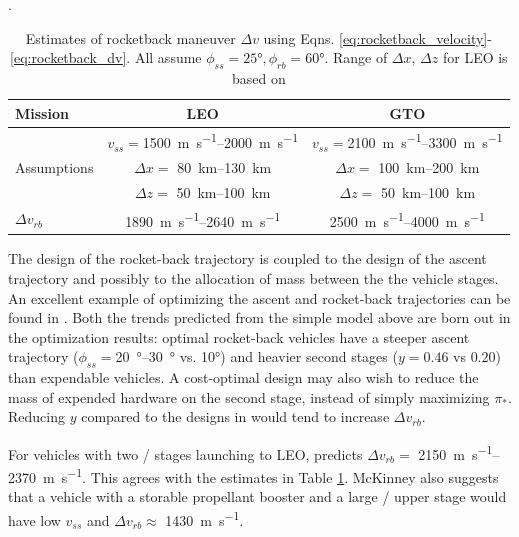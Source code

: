 \documentclass[conf]{new-aiaa}
\begin{document}
\begin{table}
	\caption{\label{tab:rocketback} Estimates of rocketback maneuver $\Delta v$ using Eqns. \ref{eq:rocketback_velocity}-\ref{eq:rocketback_dv}. All assume $\phi_{ss}=\ang{25}, \phi_{rb}=\ang{60}$. Range of $\Delta x$, $\Delta z$ for LEO is based on \cite{McKinney1986}}.
	\centering
	\begin{tabular}{l c c}
		Mission & LEO & GTO \\
		\hline
		& $v_{ss} = $\SIrange{1500}{2000}{\meter\per\second} & $v_{ss} = $\SIrange{2100}{3300}{\meter\per\second} \\
		Assumptions & $\Delta x = $ \SIrange{80}{130}{\kilo\meter} & $\Delta x = $ \SIrange{100}{200}{\kilo\meter} \\
		& $\Delta z = $ \SIrange{50}{100}{\kilo\meter} & $\Delta z = $ \SIrange{50}{100}{\kilo\meter} \\
		\hline
		$\Delta v_{rb}$ & \SIrange{1890}{2640}{\meter\per\second} & \SIrange{2500}{4000}{\meter\per\second}
		
	\end{tabular}
\end{table}

The design of the rocket-back trajectory is coupled to the design of the ascent trajectory and possibly to the allocation of mass between the the vehicle stages. An excellent example of optimizing the ascent and rocket-back trajectories can be found in \cite{McKinney1986}. Both the trends predicted from the simple model above are born out in the optimization results: optimal rocket-back vehicles have a steeper ascent trajectory ($\phi_{ss} = $\SIrange{20}{30}{\degree} vs. \ang{10}) and heavier second stages ($y=0.46$ vs $0.20$) than expendable vehicles. A cost-optimal design may also wish to reduce the mass of expended hardware on the second stage, instead of simply maximizing $\pi_*$. Reducing $y$ compared to the designs in \cite{McKinney1986} would tend to increase $\Delta v_{rb}$.

For vehicles with two / stages launching to LEO, \cite{McKinney1986} predicts $\Delta v_{rb} =$ \SIrange{2150}{2370}{\meter\per\second}. This agrees with the estimates in Table \ref{tab:rocketback}. McKinney also suggests that a vehicle with a storable propellant booster and a large / upper stage would have low $v_{ss}$ and $\Delta v_{rb} \approx$ \SI{1430}{\meter\per\second}.
\end{document}
